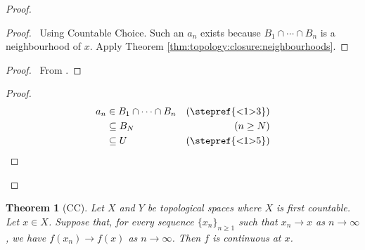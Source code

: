 \documentclass{report}
\let\qed\relax
\newtheorem{thm}[lm]{Theorem}
\theoremstyle{definition}
\begin{document}
  \begin{proof}
    \pf
    \begin{proof}
      \pf\ Using Countable Choice. Such an $a_n$ exists because $B_1 \cap
      \cdots
      \cap B_n$ is a neighbourhood of $x$. Apply Theorem
      \ref{thm:topology:closure:neighbourhoods}.
    \end{proof}
    \begin{proof}
      \pf\ From .
    \end{proof}
    \begin{proof}
      \pf
      \begin{align*}
        a_n & \in B_1 \cap \cdots \cap B_n & (\text{\stepref{<1>3}}) \\
        & \subseteq B_N & (n \geq N) \\
        & \subseteq U & (\text{\stepref{<1>5}})
      \end{align*}
    \end{proof}
    \qed
  \end{proof}

  \begin{thm}[CC]
    Let $X$ and $Y$ be topological spaces where $X$ is first countable. Let $x
    \in X$. Suppose that, for every sequence $\{ x_n \}_{n \geq 1}$ such that
    $x_n \rightarrow x$ as $n \rightarrow \infty$, we have $f(x_n) \rightarrow
    f(x)$ as $n \rightarrow \infty$. Then $f$ is continuous at $x$.
  \end{thm}
\end{document}
